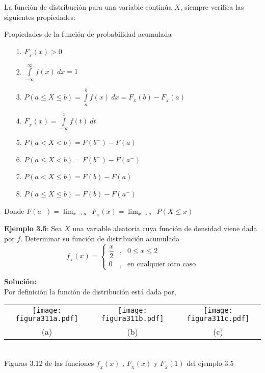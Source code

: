 \documentclass[base=hide,12pt]{elegantbook}
\begin{document}
La función de distribución para una variable continúa $X$, siempre verifica las  siguientes propiedades:
\begin{Box2}{Propiedades de la función de probabilidad acumulada}	
\begin{itemize}
	\item[1.] $F_{_X}(x)>0$
	\item[2.] $\displaystyle\int \limits_{-\infty}^{\infty}f(x)\:dx=1$
	\item[3.] $P(a\leq X\leq b)=\displaystyle\int \limits_{a}^{b} f(x)\:dx = F_{_X}(b)-F_{_X}(a)$
	\item[4.]$F_{_X}(x)=\displaystyle\int \limits_{-\infty}^{x} f(t)\:dt$	
	\item[5.] $P(a<X<b)=F(b^{-})-F(a)$
	\item[6.] $P(a\leq X<b)=F(b^{-})-F(a^{-})$
	\item[7.] $P(a< X\leq b)=F(b)-F(a)$
	\item[8.] $P(a\leq X\leq b)=F(b)-F(a^{-})$
\end{itemize}
\vspace{.5cm}

Donde  $F(a^{-}) =  \displaystyle\lim_{x \to{a^{-}}}{ F_{_{X}}(x)} = \displaystyle\lim_{x \to{a^{-}}}{ P(X \leq x)}$ 
\end{Box2}
\vspace{.5cm}
\textcolor{col3}{\bf Ejemplo 3.5}: Sea $X$ una variable aleatoria cuya  función de densidad viene dada por $f$. Determinar su función de distribución acumulada
%	
\begin{equation*}
	f_{_X}(x)=\left\lbrace
	\begin{array}{lcl}
		\dfrac{x}{2}&,& 0\leq x\leq 2 \\
		0&,& \mbox{en cualquier otro caso}
	\end{array}
	\right.
\end{equation*}

\textcolor{col3}{\bf Solución:}\\
	
Por definición la función de distribución está dada por,


	\begin{center}
		\begin{tabular}{ccc}
			\texttt{[image: figura311a.pdf]} &
			\texttt{[image: figura311b.pdf]}&
			\texttt{[image: figura311c.pdf]}\\
			(a) & (b) & (c)\\
		\end{tabular}\\
Figuras 3.12 de las funciones  $f_{_{X}}(x)$ , $F_{_{X}}(x)$ y $F_{_{X}}(1)$ del ejemplo 3.5
	\end{center}
\end{document}
